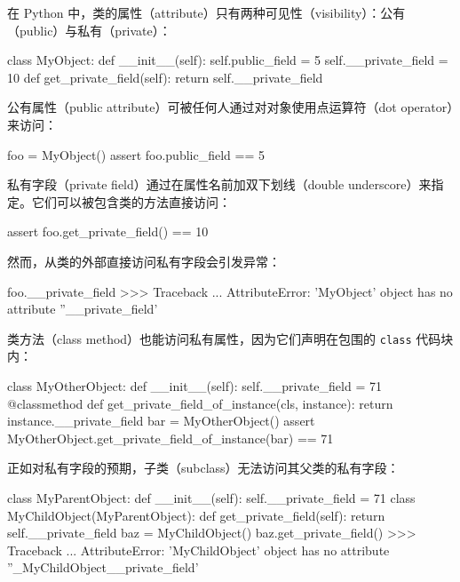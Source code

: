 在 Python 中，类的属性（attribute）只有两种可见性（visibility）：公有（public）与私有（private）：

\begin{codebox}[python]
class MyObject:
    def __init__(self):
        self.public_field = 5
        self.__private_field = 10
    def get_private_field(self):
        return self.__private_field
\end{codebox}

公有属性（public attribute）可被任何人通过对对象使用点运算符（dot operator）来访问：

\begin{codebox}[python]
foo = MyObject()
assert foo.public_field == 5
\end{codebox}

私有字段（private field）通过在属性名前加双下划线（double underscore）来指定。它们可以被包含类的方法直接访问：

\begin{codebox}[python]
assert foo.get_private_field() == 10
\end{codebox}

然而，从类的外部直接访问私有字段会引发异常：

\begin{codebox}[python]
foo.__private_field
>>>
Traceback ...
AttributeError: 'MyObject' object has no attribute
''__private_field'
\end{codebox}

类方法（class method）也能访问私有属性，因为它们声明在包围的 \texttt{class} 代码块内：

\begin{codebox}[python]
class MyOtherObject:
    def __init__(self):
        self.__private_field = 71
    @classmethod
    def get_private_field_of_instance(cls, instance):
        return instance.__private_field
bar = MyOtherObject()
assert MyOtherObject.get_private_field_of_instance(bar) == 71
\end{codebox}

正如对私有字段的预期，子类（subclass）无法访问其父类的私有字段：

\begin{codebox}[python]
class MyParentObject:
    def __init__(self):
        self.__private_field = 71
class MyChildObject(MyParentObject):
    def get_private_field(self):
        return self.__private_field
baz = MyChildObject()
baz.get_private_field()
>>>
Traceback ...
AttributeError: 'MyChildObject' object has no attribute
''_MyChildObject__private_field'
\end{codebox}

